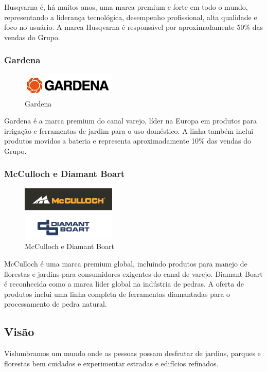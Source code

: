 \documentclass[12pt]{article}
\begin{document}
	Husqvarna é, há muitos anos, uma marca premium e forte em todo o mundo, representando a liderança tecnológica, desempenho profissional, alta qualidade e foco no usuário. A marca Husqvarna é responsável por aproximadamente 50\% das vendas do Grupo.

\subsubsection{Gardena}

\begin{figure}[h!]
	\centering
	\includegraphics[width=0.4\textwidth]{img/logo-gardena.png}
	\caption{Gardena}
\end{figure}

	Gardena é a marca premium do canal varejo, líder na Europa em produtos para irrigação e ferramentas de jardim para o uso doméstico. A linha também inclui produtos movidos a bateria e representa aproximadamente 10\% das vendas do Grupo.

\subsubsection{McCulloch e Diamant Boart}

\begin{figure}[h!]
	\centering
	\includegraphics[width=0.4\textwidth]{img/logo-mcdb.png}
	\caption{McCulloch e Diamant Boart}
\end{figure}

	McCulloch é uma marca premium global, incluindo produtos para manejo de florestas e jardins para consumidores exigentes do canal de varejo. 
	Diamant Boart é reconhecida como a marca líder global na indústria de pedras. A oferta de produtos inclui uma linha completa de ferramentas diamantadas para o processamento de pedra natural.	

\subsection{Visão}
	Vislumbramos um mundo onde as pessoas possam desfrutar de jardins, parques e florestas bem cuidados e experimentar estradas e edifícios refinados.
\end{document}
